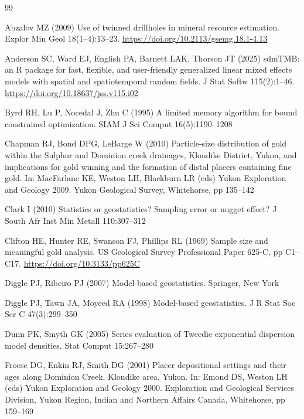 \documentclass[11pt,a4paper]{article}
\theoremstyle{remark}
\begin{document}
\begin{thebibliography}{99}
\setlength{\itemsep}{2pt}
\small

Abzalov MZ (2009) Use of twinned drillholes in mineral resource estimation. Explor Min Geol 18(1--4):13--23. \url{https://doi.org/10.2113/gsemg.18.1-4.13}

Anderson SC, Ward EJ, English PA, Barnett LAK, Thorson JT (2025) sdmTMB: an R package for fast, flexible, and user-friendly generalized linear mixed effects models with spatial and spatiotemporal random fields. J Stat Softw 115(2):1--46. \url{https://doi.org/10.18637/jss.v115.i02}

Byrd RH, Lu P, Nocedal J, Zhu C (1995) A limited memory algorithm for bound constrained optimization. SIAM J Sci Comput 16(5):1190--1208

Chapman RJ, Bond DPG, LeBarge W (2010) Particle-size distribution of gold within the Sulphur and Dominion creek drainages, Klondike District, Yukon, and implications for gold winning and the formation of distal placers containing fine gold. In: MacFarlane KE, Weston LH, Blackburn LR (eds) Yukon Exploration and Geology 2009. Yukon Geological Survey, Whitehorse, pp 135--142

Clark I (2010) Statistics or geostatistics? Sampling error or nugget effect? J South Afr Inst Min Metall 110:307--312

Clifton HE, Hunter RE, Swanson FJ, Phillips RL (1969) Sample size and meaningful gold analysis. US Geological Survey Professional Paper 625-C, pp C1--C17. \url{https://doi.org/10.3133/pp625C}

Diggle PJ, Ribeiro PJ (2007) Model-based geostatistics. Springer, New York

Diggle PJ, Tawn JA, Moyeed RA (1998) Model-based geostatistics. J R Stat Soc Ser C 47(3):299--350

Dunn PK, Smyth GK (2005) Series evaluation of Tweedie exponential dispersion model densities. Stat Comput 15:267--280

Froese DG, Enkin RJ, Smith DG (2001) Placer depositional settings and their ages along Dominion Creek, Klondike area, Yukon. In: Emond DS, Weston LH (eds) Yukon Exploration and Geology 2000. Exploration and Geological Services Division, Yukon Region, Indian and Northern Affairs Canada, Whitehorse, pp 159--169


\end{thebibliography}
\end{document}
